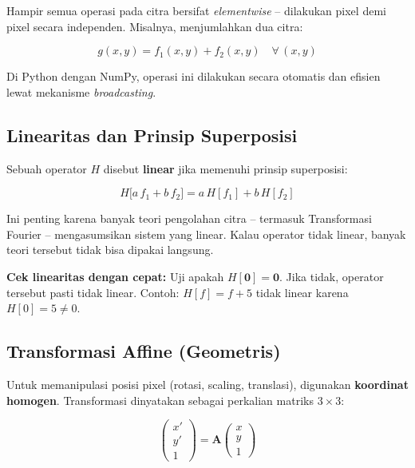 \documentclass[12pt,a4paper]{article}
\begin{document}
Hampir semua operasi pada citra bersifat \textit{elementwise} -- dilakukan
pixel demi pixel secara independen. Misalnya, menjumlahkan dua citra:
 
\begin{equation}
  g(x,y) = f_1(x,y) + f_2(x,y) \quad \forall\,(x,y)
\end{equation}
 
Di Python dengan NumPy, operasi ini dilakukan secara otomatis dan efisien lewat mekanisme
\textit{broadcasting}.
 
\subsection{Linearitas dan Prinsip Superposisi}
 
Sebuah operator $H$ disebut \textbf{linear} jika memenuhi prinsip superposisi:
 
\begin{equation}
  H\bigl[a\,f_1 + b\,f_2\bigr] = a\,H[f_1] + b\,H[f_2]
  \label{eq:linear}
\end{equation}
 
Ini penting karena banyak teori pengolahan citra -- termasuk Transformasi Fourier --
mengasumsikan sistem yang linear. Kalau operator tidak linear, banyak teori tersebut
tidak bisa dipakai langsung.
 
\begin{tipbox}
  \textbf{Cek linearitas dengan cepat:} Uji apakah $H[\mathbf{0}] = \mathbf{0}$.
  Jika tidak, operator tersebut pasti tidak linear. Contoh: $H[f] = f + 5$
  tidak linear karena $H[0] = 5 \neq 0$.
\end{tipbox}
 
\subsection{Transformasi Affine (Geometris)}
 
Untuk memanipulasi posisi pixel (rotasi, scaling, translasi), digunakan
\textbf{koordinat homogen}. Transformasi dinyatakan sebagai perkalian matriks $3\times3$:
 
\begin{equation}
  \begin{pmatrix} x' \\ y' \\ 1 \end{pmatrix}
  = \mathbf{A}
  \begin{pmatrix} x \\ y \\ 1 \end{pmatrix}
  \label{eq:affine}
\end{equation}
 
\end{document}
